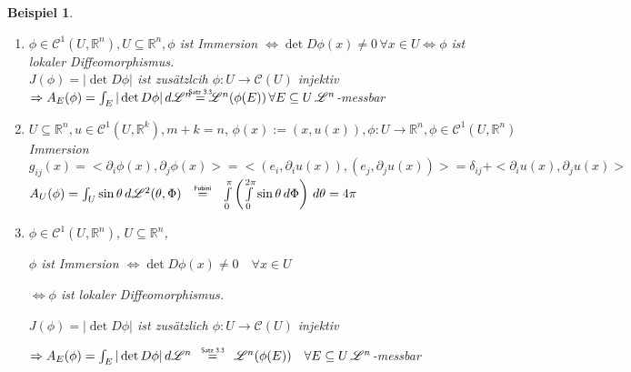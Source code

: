 \documentclass[11pt]{memoir}
\theoremstyle{changebreak}
\newtheorem{Beispiel}{Beispiel}[chapter]
\newcommand\overequal[1]{\mathrel{\overset{\makebox[0pt]{\mbox{\normalfont\tiny\sffamily $ #1 $}}}{=}}}
\begin{document}
\begin{Beispiel}
\begin{enumerate}

	$A_U(\phi) = \int_U \sin\theta\,d\mathscr L^2(\theta, \Phi) \overequal{\text{Fubini}} \int\limits_0^\pi \left( \int\limits_0^{2\pi} \sin\theta \, d\Phi\right) \,d\theta = 4 \pi$
	
	\item $\phi \in \mathscr C^1(U, \mathbb R^n), U \subseteq \mathbb R^n, \phi$ ist Immersion $\Leftrightarrow \det D\phi(x) \ne 0 \, \forall x \in U \Leftrightarrow \phi$ ist lokaler Diffeomorphismus. \\
	$J(\phi)= |\det D\phi|$ ist zusätzlcih $\phi: U \rightarrow \mathscr C(U)$ injektiv \\
	$\Rightarrow A_E (\phi) = \int_E |\det D\phi|\, d\mathscr L^n \overequal{\text{Satz 3.3}} \mathscr L^n(\phi(E)) \, \forall E \subseteq U \, \mathscr L^n$-messbar

	\item $U \subseteq \mathbb R^n, u \in \mathscr C^1(U, \mathbb R^k), m+k =n,\, \phi(x) := (x, u(x)), \phi: U \rightarrow \mathbb R^n, \phi \in \mathscr C^1(U, \mathbb R^n)$ Immersion \\
	$g_{ij}(x) = <\partial_i \phi(x), \partial_j \phi(x)> = <(e_i, \partial_i u(x)), (e_j, \partial_j u(x))> =
	\delta_{ij} + <\partial_i u(x), \partial_j u(x)> $ \\

	
	$A_U(\phi) = \int_U \sin\theta\,d\mathscr L^2(\theta, \Phi) \quad \overequal{\text{Fubini}} \quad \int\limits_0^\pi \left( \int\limits_0^{2\pi} \sin\theta \, d\Phi\right) \,d\theta = 4 \pi$
	
	\item $\phi \in \mathscr C^1(U, \mathbb R^n), \, U \subseteq \mathbb R^n$, 
	\par
	$\phi$ ist Immersion $\Leftrightarrow \det D\phi(x) \ne 0 \quad \forall x \in U$
	\par
	$\Leftrightarrow \phi$ ist lokaler Diffeomorphismus. 
	\par
	$J(\phi)= |\det D\phi|$ ist zusätzlich $\phi: U \rightarrow \mathscr C(U)$ injektiv 
	\par
	$\Rightarrow A_E (\phi) = \int_E |\det D\phi|\, d\mathscr L^n \quad \overequal{\text{Satz 3.3}} \quad \mathscr L^n(\phi(E)) \quad \forall E \subseteq U \, \mathscr L^n$-messbar
	

\end{enumerate}
\end{Beispiel}
\end{document}
